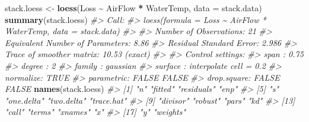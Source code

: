 \documentclass[
]{book}
\newenvironment{Shaded}{\begin{snugshade}}{\end{snugshade}}
\newcommand{\AttributeTok}[1]{\textcolor[rgb]{0.13,0.29,0.53}{#1}}
\newcommand{\CommentTok}[1]{\textcolor[rgb]{0.56,0.35,0.01}{\textit{#1}}}
\newcommand{\FunctionTok}[1]{\textcolor[rgb]{0.13,0.29,0.53}{\textbf{#1}}}
\newcommand{\NormalTok}[1]{#1}
\newcommand{\OtherTok}[1]{\textcolor[rgb]{0.56,0.35,0.01}{#1}}
\newcommand{\SpecialCharTok}[1]{\textcolor[rgb]{0.81,0.36,0.00}{\textbf{#1}}}
\begin{document}
\begin{Shaded}
\begin{Highlighting}[]
\NormalTok{stack.loess }\OtherTok{\textless{}{-}} \FunctionTok{loess}\NormalTok{(Loss }\SpecialCharTok{\textasciitilde{}}\NormalTok{ AirFlow }\SpecialCharTok{*}\NormalTok{ WaterTemp, }\AttributeTok{data =}\NormalTok{ stack.data)}
\FunctionTok{summary}\NormalTok{(stack.loess)}
\CommentTok{\#\textgreater{} Call:}
\CommentTok{\#\textgreater{} loess(formula = Loss \textasciitilde{} AirFlow * WaterTemp, data = stack.data)}
\CommentTok{\#\textgreater{} }
\CommentTok{\#\textgreater{} Number of Observations: 21 }
\CommentTok{\#\textgreater{} Equivalent Number of Parameters: 8.86 }
\CommentTok{\#\textgreater{} Residual Standard Error: 2.986 }
\CommentTok{\#\textgreater{} Trace of smoother matrix: 10.53  (exact)}
\CommentTok{\#\textgreater{} }
\CommentTok{\#\textgreater{} Control settings:}
\CommentTok{\#\textgreater{}   span     :  0.75 }
\CommentTok{\#\textgreater{}   degree   :  2 }
\CommentTok{\#\textgreater{}   family   :  gaussian}
\CommentTok{\#\textgreater{}   surface  :  interpolate      cell = 0.2}
\CommentTok{\#\textgreater{}   normalize:  TRUE}
\CommentTok{\#\textgreater{}  parametric:  FALSE FALSE}
\CommentTok{\#\textgreater{} drop.square:  FALSE FALSE}
\FunctionTok{names}\NormalTok{(stack.loess)}
\CommentTok{\#\textgreater{}  [1] "n"         "fitted"    "residuals" "enp"      }
\CommentTok{\#\textgreater{}  [5] "s"         "one.delta" "two.delta" "trace.hat"}
\CommentTok{\#\textgreater{}  [9] "divisor"   "robust"    "pars"      "kd"       }
\CommentTok{\#\textgreater{} [13] "call"      "terms"     "xnames"    "x"        }
\CommentTok{\#\textgreater{} [17] "y"         "weights"}


\end{Highlighting}
\end{Shaded}
\end{document}
